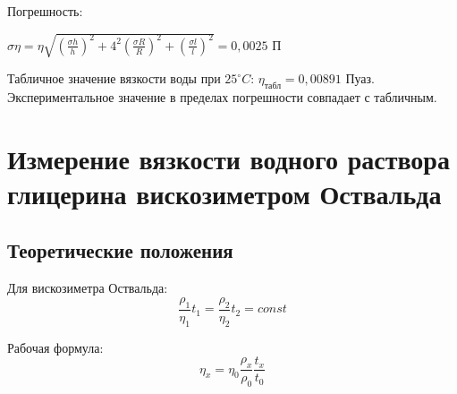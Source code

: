 \documentclass[a4paper]{article}
\begin{document}
\begin{enumerate}
    Погрешность:
    \begin{center}
    $\sigma \eta = \eta \sqrt{(\frac{\sigma h}{h})^2 + 4^2(\frac{\sigma R}{R})^2 + (\frac{\sigma l}{l})^2} = 0,0025$ П
    \end{center}

    Табличное значение вязкости воды при $25^\circ C$: $\eta_{\text{табл}} = 0,00891$ Пуаз. Экспериментальное значение в пределах погрешности совпадает с табличным.

    \begin{center}
    \end{center}
\end{enumerate}

\section{Измерение вязкости водного раствора глицерина вискозиметром Оствальда}
\subsection{Теоретические положения}
Для вискозиметра Оствальда:
$$\frac{\rho_1}{\eta_1}t_1 = \frac{\rho_2}{\eta_2}t_2 = const$$

Рабочая формула:
$$\eta_x = \eta_0\frac{\rho_x}{\rho_0}\frac{t_x}{t_0}$$
\end{document}
